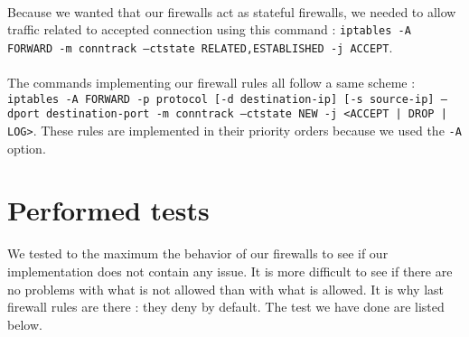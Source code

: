 \documentclass[a4paper, 11pt, oneside]{article}
\begin{document}
\paragraph{}Because we wanted that our firewalls act as stateful firewalls, we needed to allow traffic related to accepted connection using this command : \texttt{iptables -A FORWARD -m conntrack --ctstate RELATED,ESTABLISHED -j ACCEPT}.

\paragraph{}The commands implementing our firewall rules all follow a same scheme : \texttt{iptables -A FORWARD -p protocol [-d destination-ip] [-s source-ip] --dport destination-port -m conntrack --ctstate NEW -j <ACCEPT | DROP | LOG>}. These rules are implemented in their priority orders because we used the \texttt{-A} option. 

\section{Performed tests}

We tested to the maximum the behavior of our firewalls to see if our implementation does not contain any issue. It is more difficult to see if there are no problems with what is not allowed than with what is allowed. It is why last firewall rules are there : they deny by default. The test we have done are listed below.
\end{document}
